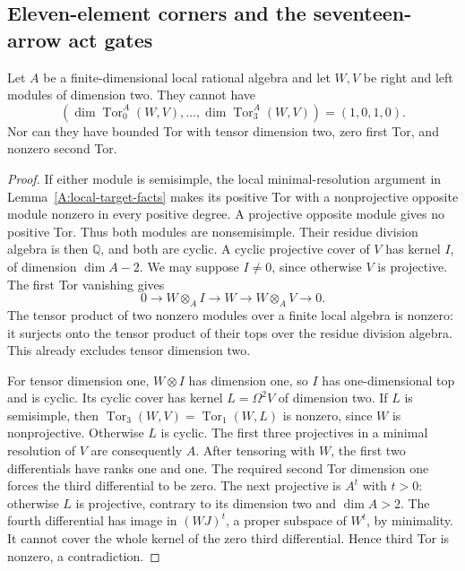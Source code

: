 \subsection{Eleven-element corners and the seventeen-arrow act gates}

\begin{lemma}
\label{CP2:A-local-two-by-two}
Let $A$ be a finite-dimensional local rational algebra and let
$W,V$ be right and left modules of dimension two. They cannot have
\[
 (\dim\operatorname{Tor}_0^A(W,V),\ldots,
   \dim\operatorname{Tor}_3^A(W,V))=(1,0,1,0).
\]
Nor can they have bounded Tor with tensor dimension two,
zero first Tor, and nonzero second Tor.
\end{lemma}
\begin{proof}
If either module is semisimple, the local minimal-resolution
argument in Lemma~\ref{A:local-target-facts} makes its positive
Tor with a nonprojective opposite module nonzero in every
positive degree. A projective opposite module gives no positive
Tor. Thus both modules are nonsemisimple. Their residue division
algebra is then $\mathbb Q$, and both are cyclic. A cyclic
projective cover of $V$ has kernel $I$, of dimension $\dim A-2$.
We may suppose $I\ne0$, since otherwise $V$ is projective.
The first Tor vanishing gives
\[
 0\longrightarrow W\otimes_A I\longrightarrow W
   \longrightarrow W\otimes_A V\longrightarrow0.
\]
The tensor product of two nonzero modules over a finite local
algebra is nonzero: it surjects onto the tensor product of their
tops over the residue division algebra. This already excludes
tensor dimension two.

For tensor dimension one, $W\otimes I$ has dimension one, so
$I$ has one-dimensional top and is cyclic. Its cyclic cover
has kernel $L=\Omega^2 V$ of dimension two. If $L$ is semisimple,
then $\operatorname{Tor}_3(W,V)=\operatorname{Tor}_1(W,L)$
is nonzero, since $W$ is nonprojective. Otherwise $L$ is cyclic.
The first three projectives in a minimal resolution of $V$
are consequently $A$. After tensoring with $W$, the first two
differentials have ranks one and one. The required second Tor
dimension one forces the third differential to be zero.
The next projective is $A^t$ with $t>0$: otherwise $L$ is
projective, contrary to its dimension two and $\dim A>2$.
The fourth differential has image in $(WJ)^t$, a proper
subspace of $W^t$, by minimality. It cannot cover the whole
kernel of the zero third differential. Hence third Tor is
nonzero, a contradiction.
\end{proof}

